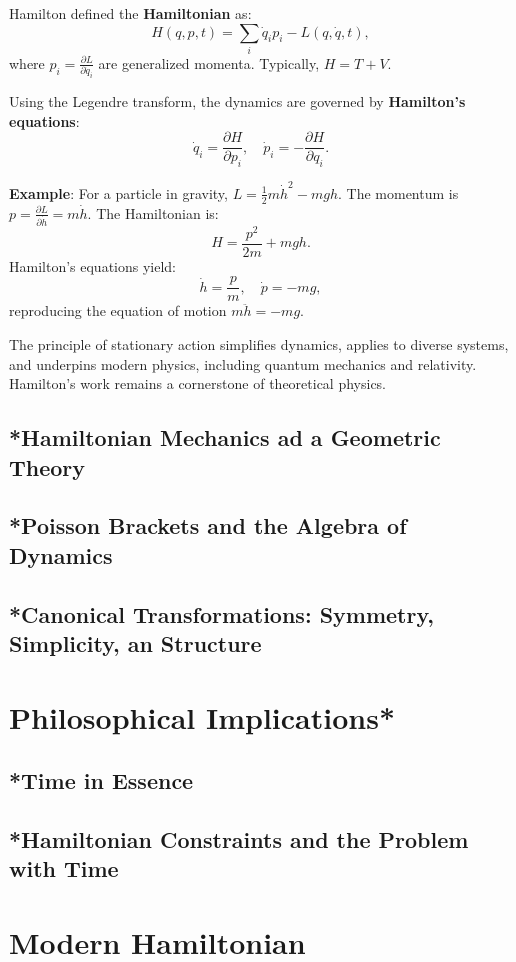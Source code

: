 Hamilton defined the \textbf{Hamiltonian} as:
\[
H(q, p, t) = \sum_i \dot{q}_i p_i - L(q, \dot{q}, t),
\]
where \( p_i = \frac{\partial L}{\partial \dot{q}_i} \) are generalized momenta. Typically, \( H = T + V \).

Using the Legendre transform, the dynamics are governed by \textbf{Hamilton's equations}:
\[
\dot{q}_i = \frac{\partial H}{\partial p_i}, \quad \dot{p}_i = -\frac{\partial H}{\partial q_i}.
\]

\textbf{Example}: For a particle in gravity, \( L = \frac{1}{2} m \dot{h}^2 - mgh \). The momentum is \( p = \frac{\partial L}{\partial \dot{h}} = m \dot{h} \). The Hamiltonian is:
\[
H = \frac{p^2}{2m} + mgh.
\]
Hamilton's equations yield:
\[
\dot{h} = \frac{p}{m}, \quad \dot{p} = -mg,
\]
reproducing the equation of motion \( m \ddot{h} = -mg \).

The principle of stationary action simplifies dynamics, applies to diverse systems, and underpins modern physics, including quantum mechanics and relativity. Hamilton's work remains a cornerstone of theoretical physics.
\subsection{*Hamiltonian Mechanics ad a Geometric Theory}
\subsection{*Poisson Brackets and the Algebra of Dynamics}
\subsection{*Canonical Transformations: Symmetry, Simplicity, an Structure}

\section{Philosophical Implications*}
\subsection{*Time in Essence}
\subsection{*Hamiltonian Constraints and the Problem with Time}

\section{Modern Hamiltonian}

